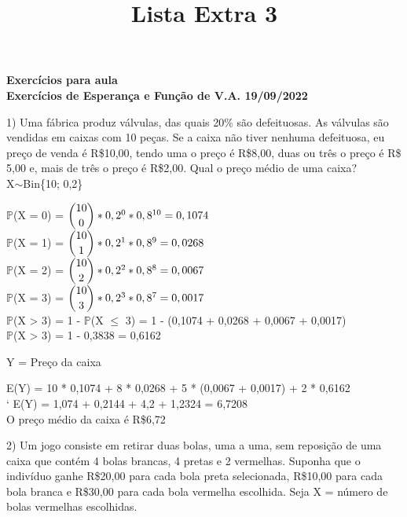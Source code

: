 \documentclass[12pt,a4paper]{article}
\title{Lista Extra 3}
\date{}
\begin{document}
	\maketitle
	\begin{center}
		\textbf{Exercícios para aula}\\
		\textbf{Exercícios de Esperança e Função de V.A. 19/09/2022}
	\end{center}
	1) Uma fábrica produz válvulas, das quais 20\% são defeituosas. As válvulas são vendidas em caixas com 10 peças. Se a caixa não tiver nenhuma defeituosa, eu preço de venda é R\$10,00, tendo uma o preço é R\$8,00, duas ou três o preço é R\$ 5,00 e, mais de três o preço é R\$2,00. Qual o preço médio de uma caixa?
	\vspace{1cm}\\
	X$\sim$Bin\{10; 0,2\}
	\vspace{1cm}
	\begin{center}
		$\mathbb{P}$(X = 0) = $\dbinom{10}{0} * 0,2^0 * 0,8^{10} = 0,1074$
		\vspace{1cm}\\
		$\mathbb{P}$(X = 1) = $\dbinom{10}{1} * 0,2^1 * 0,8^9 = 0,0268$
		\vspace{1cm}\\
		$\mathbb{P}$(X = 2) = $\dbinom{10}{2} * 0,2^2 * 0,8^8 = 0,0067$
		\vspace{1cm}\\
		$\mathbb{P}$(X = 3) = $\dbinom{10}{3} * 0,2^3 * 0,8^7 = 0,0017$
		\vspace{1cm}\\
		$\mathbb{P}$(X > 3) = 1 - $\mathbb{P}$(X $\leq$ 3) = 1 - (0,1074 + 0,0268 + 0,0067 + 0,0017)
		\vspace{0.25cm}\\
		$\mathbb{P}$(X > 3) = 1 - 0,3838 = 0,6162
	\end{center}
	\vspace{1cm}
	Y = Preço da caixa
	\vspace{1cm}\\
	\begin{center}	
		E(Y) = 10 * 0,1074 + 8 * 0,0268 + 5 * (0,0067 + 0,0017) + 2 * 0,6162
		\vspace{0.25cm}\\`
		E(Y) =  1,074 + 0,2144 + 4,2 + 1,2324 = 6,7208
		\vspace{1cm}\\
		O preço médio da caixa é R\$6,72
	\end{center}
	\vspace{1cm}
	2) Um jogo consiste em retirar duas bolas, uma a uma, sem reposição de uma caixa que contém 4 bolas brancas, 4 pretas e 2 vermelhas. Suponha que o indivíduo ganhe R\$20,00 para cada bola preta selecionada, R\$10,00 para cada bola branca e R\$30,00 para cada bola vermelha escolhida. Seja X = número de bolas vermelhas escolhidas.\\
\end{document}
